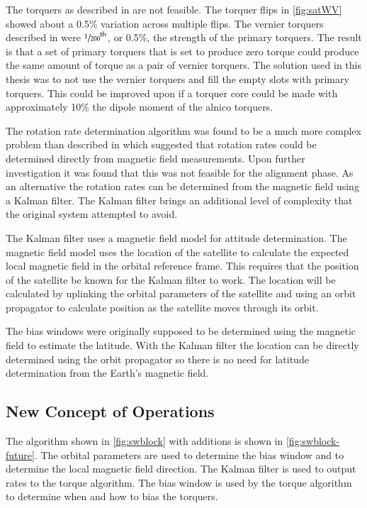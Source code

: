 The torquers as described in \cite{Mentch11} are not feasible. The torquer flips in \cref{fig:satWV} showed about a \textpm{}0.5\% variation across multiple flips. The vernier torquers described in \cite{Mentch11} were $\sfrac{1}{200}^{\mathrm{th}}$, or 0.5\%, the strength of the primary torquers. The result is that a set of primary torquers that is set to produce zero torque could produce the same amount of torque as a pair of vernier torquers. The solution used in this thesis was to not use the vernier torquers and fill the empty slots with primary torquers. This could be improved upon if a torquer core could be made with approximately 10\% the dipole moment of the alnico torquers. 

The rotation rate determination algorithm was found to be a much more complex problem than described in \cite{Mentch11} which suggested that rotation rates could be determined directly from magnetic field measurements. Upon further investigation it was found that this was not feasible for the alignment phase. As an alternative the rotation rates can be determined from the magnetic field using a Kalman filter. The Kalman filter brings an additional level of complexity that the original system attempted to avoid. 

The Kalman filter uses a magnetic field model for attitude determination. The magnetic field model uses the location of the satellite to calculate the expected local magnetic field in the orbital reference frame. This requires that the position of the satellite be known for the Kalman filter to work. The location will be calculated by uplinking the orbital parameters of the satellite and using an orbit propagator to calculate position as the satellite moves through its orbit.

The bias windows were originally supposed to be determined using the magnetic field to estimate the latitude. With the Kalman filter the location can be directly determined using the orbit propagator so there is no need for latitude determination from the Earth's magnetic field.

\subsection{New Concept of Operations}

The algorithm shown in \cref{fig:swblock} with additions is shown in \cref{fig:swblock-future}. The orbital parameters are used to determine the bias window and to determine the local magnetic field direction. The Kalman filter is used to output rates to the torque algorithm. The bias window is used by the torque algorithm to determine when and how to bias the torquers.

